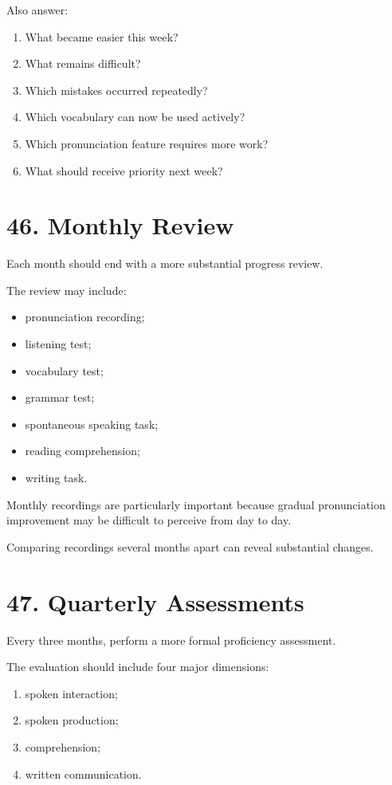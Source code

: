 Also answer:

\begin{enumerate}
    \item What became easier this week?
    \item What remains difficult?
    \item Which mistakes occurred repeatedly?
    \item Which vocabulary can now be used actively?
    \item Which pronunciation feature requires more work?
    \item What should receive priority next week?
\end{enumerate}

\section*{46. Monthly Review}

Each month should end with a more substantial progress review.

The review may include:

\begin{itemize}
    \item pronunciation recording;
    \item listening test;
    \item vocabulary test;
    \item grammar test;
    \item spontaneous speaking task;
    \item reading comprehension;
    \item writing task.
\end{itemize}

Monthly recordings are particularly important because gradual pronunciation improvement may be difficult to perceive from day to day.

Comparing recordings several months apart can reveal substantial changes.

\section*{47. Quarterly Assessments}

Every three months, perform a more formal proficiency assessment.

The evaluation should include four major dimensions:

\begin{enumerate}
    \item spoken interaction;
    \item spoken production;
    \item comprehension;
    \item written communication.
\end{enumerate}

